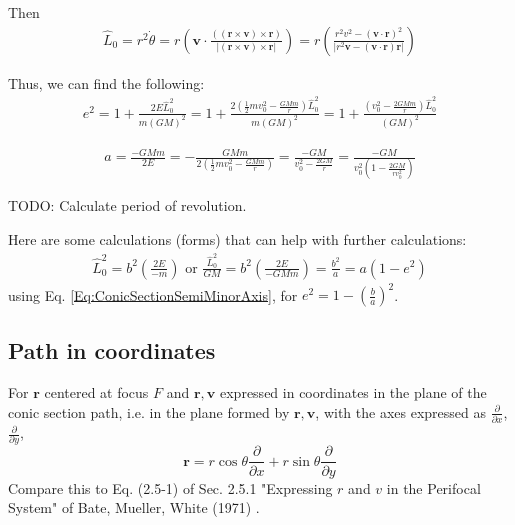 \documentclass[10pt]{amsart}
\begin{document}
\begin{multicols*}{2}
Then
\[
\begin{gathered}
\widehat{L}_0 = r^2 \dot{\theta} = r \left( \mathbf{v} \cdot  \frac{ ((\mathbf{r} \times \mathbf{v}) \times \mathbf{r}) }{ | (\mathbf{r} \times \mathbf{v} ) \times \mathbf{r} | } \right) = r \left( \frac{r^2 v^2 - (\mathbf{v} \cdot \mathbf{r})^2 }{ |r^2 \mathbf{v} - (\mathbf{v} \cdot \mathbf{r}) \mathbf{r} | } \right) 
\end{gathered}
\]

Thus, we can find the following:
\[
\begin{gathered} 
e^2 = 1 + \frac{ 2 E \widehat{L}_0^2 }{ m (GM)^2 } = 1 + \frac{ 2 \left( \frac{1}{2} m v_0^2 - \frac{GM m }{r} \right) \widehat{L}_0^2 }{ m (GM)^2 }  = 1 + \frac{\left( v_0^2 - \frac{2GMm}{r} \right) \widehat{L}_0^2 }{ (GM)^2 }
\end{gathered} 
\]

\[
\begin{gathered} 
a = \frac{-GMm}{2E} = -\frac{GMm}{ 2 \left( \frac{1}{2} mv_0^2 - \frac{GMm}{r} \right) } = \frac{-GM}{v_0^2 - \frac{2GM}{r} } = \frac{-GM}{ v_0^2 \left( 1 -  \frac{2GM}{rv_0^2 } \right) }
\end{gathered} 
\]


TODO: Calculate period of revolution. 

Here are some calculations (forms) that can help with further calculations:
\begin{equation}
\begin{gathered} 
	\widehat{L}_0^2 = b^2 \left( \frac{2E}{-m} \right) \text{ or } \frac{\widehat{L}_0^2}{GM} = b^2 \left( \frac{2E}{-GMm } \right) = \frac{b^2}{a} = a(1-e^2)
\end{gathered} 
\end{equation}
using Eq. \ref{Eq:ConicSectionSemiMinorAxis}, for $e^2 = 1 - \left( \frac{b}{a} \right)^2$. 


\subsection{Path in coordinates} 

For $\mathbf{r}$ centered at focus $F$ and $\mathbf{r}, \mathbf{v}$ expressed in coordinates in the plane of the conic section path, i.e. in the plane formed by $\mathbf{r}, \mathbf{v}$, with the axes expressed as $\frac{\partial}{\partial x}$, $\frac{ \partial }{ \partial y}$, 
\begin{equation}
\mathbf{r} = r\cos{\theta} \frac{\partial }{ \partial x} + r\sin{\theta} \frac{\partial}{\partial y}
\end{equation}
Compare this to Eq. (2.5-1) of Sec. 2.5.1 "Expressing $r$ and $v$ in the Perifocal System" of Bate, Mueller, White (1971) \cite{BMW1971}.


\end{multicols*}
\end{document}

